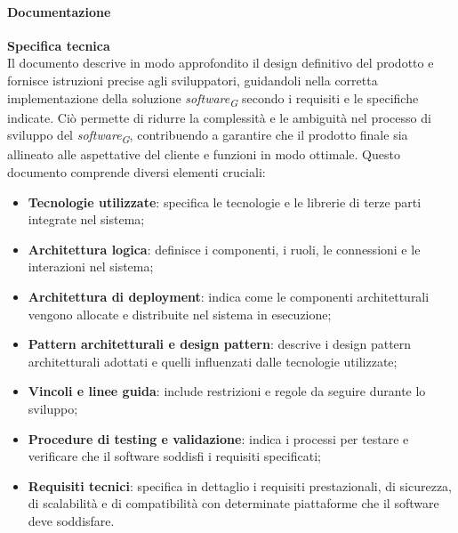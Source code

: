 \paragraph{Documentazione}
\textbf{Specifica tecnica} \\
Il documento descrive in modo approfondito il design definitivo del prodotto e fornisce istruzioni precise agli sviluppatori, guidandoli nella corretta implementazione della soluzione \textit{software}\textsubscript{\textit{G}} secondo i requisiti e le specifiche indicate. Ciò permette di ridurre la complessità e le ambiguità nel processo di sviluppo del \textit{software}\textsubscript{\textit{G}}, contribuendo a garantire che il prodotto finale sia allineato alle aspettative del cliente e funzioni in modo ottimale.
Questo documento comprende diversi elementi cruciali: 
\begin{itemize}
    \item \textbf{Tecnologie utilizzate}: specifica le tecnologie e le librerie di terze parti integrate nel sistema;
    \item \textbf{Architettura logica}: definisce i componenti, i ruoli, le connessioni e le interazioni nel sistema;
    \item \textbf{Architettura di deployment}: indica come le componenti architetturali vengono allocate e distribuite nel sistema in esecuzione;
    \item \textbf{Pattern architetturali e design pattern}: descrive i design pattern architetturali adottati e quelli influenzati dalle tecnologie utilizzate;
    \item \textbf{Vincoli e linee guida}: include restrizioni e regole da seguire durante lo sviluppo;
    \item \textbf{Procedure di testing e validazione}: indica i processi per testare e verificare che il software soddisfi i requisiti specificati;
    \item \textbf{Requisiti tecnici}: specifica in dettaglio i requisiti prestazionali, di sicurezza, di scalabilità e di compatibilità con determinate piattaforme che il software deve soddisfare.
\end{itemize}

